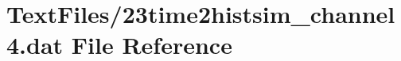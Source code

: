 \hypertarget{23time2histsim__channel4_8dat}{}\section{Text\+Files/23time2histsim\+\_\+channel4.dat File Reference}
\label{23time2histsim__channel4_8dat}
